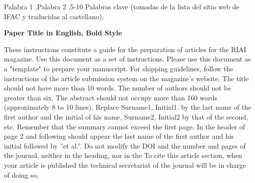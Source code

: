 \documentclass[5p,times,authoryear]{sciarticle}
\begin{document}
\begin{frontmatter}
\begin{abstract}
Estas instrucciones constituyen una guía para la preparación de artículos para la revista RIAI. Utilice este documento como un conjunto de instrucciones. Por favor, utilice este documento como una ''plantilla'' para preparar su manuscrito. Para las directrices de envío, siga las instrucciones del sistema de envío de artículos de la página web de la revista. El título no debe tener más de 10 palabras. El número de autores no debe ser mayor de seis. El resumen no debe ocupar más de 160 palabras (aproximadamente de 8 a 10 líneas). Sustituya Apellido1, Inicial1. por el apellido del primer autor y la inicial de su nombre, Apellido2, Inicial2 por el del segundo, etc. Recuerde que el resumen no puede superar la primera página. En el encabezado de la página 2 y siguientes debe aparecer el apellido del primer autor y su inicial seguido por ''et al.''. No modifique el DOI y el número y páginas de la revista, ni en el encabezado, ni en el apartado To cite this article, cuando su artículo sea publicado la secretaría técnica de la revista será la encargada de hacerlo.
\end{abstract}

\begin{keyword}
Palabra 1 \sep Palabra 2 \sep 5-10 Palabras clave (tomadas de la lista del sitio web de IFAC y traducidas al castellano).
\end{keyword}

\begin{englishtitle}
\noindent \textbf{Paper Title in English, Bold Style}
\end{englishtitle}

\begin{abstractIng}
These instructions constitute a guide for the preparation of articles for the RIAI magazine. Use this document as a set of instructions. Please use this document as a "template" to prepare your manuscript. For shipping guidelines, follow the instructions of the article submission system on the magazine's website. The title should not have more than 10 words. The number of authors should not be greater than six. The abstract should not occupy more than 160 words (approximately 8 to 10 lines). Replace Surname1, Initial1. by the last name of the first author and the initial of his name, Surname2, Initial2 by that of the second, etc. Remember that the summary cannot exceed the first page. In the header of page 2 and following should appear the last name of the first author and his initial followed by ''et al.''. Do not modify the DOI and the number and pages of the journal, neither in the heading, nor in the To cite this article section, when your article is published the technical secretariat of the journal will be in charge of doing so.
\end{abstractIng}


\end{frontmatter}
\end{document}
